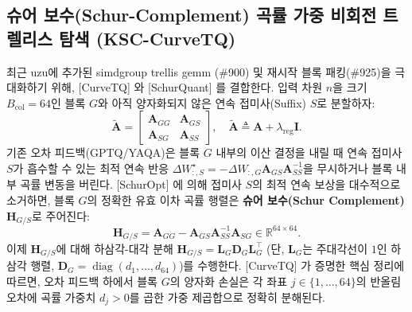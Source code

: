 \documentclass[10pt,a4paper]{article}
\begin{document}
\subsection{슈어 보수(Schur-Complement) 곡률 가중 비회전 트렐리스 탐색 (KSC-CurveTQ)}
최근 \textsf{uzu}에 추가된 \textsf{simdgroup trellis gemm} (\#900) 및 재시작 블록 패킹(\#925)을 극대화하기 위해, [CurveTQ] \cite{ding2026curvetq}와 [SchurQuant] \cite{lee2026schurquant}를 결합한다. 입력 차원 $n$을 크기 $B_{\text{col}}=64$인 블록 $G$와 아직 양자화되지 않은 연속 접미사(Suffix) $S$로 분할하자:
\begin{equation}
\widetilde{\mathbf{A}} = \begin{bmatrix} \mathbf{A}_{GG} & \mathbf{A}_{GS} \\ \mathbf{A}_{SG} & \mathbf{A}_{SS} \end{bmatrix}, \quad \widetilde{\mathbf{A}} \triangleq \mathbf{A} + \lambda_{\text{reg}} \mathbf{I}.
\end{equation}
기존 오차 피드백(GPTQ/YAQA)은 블록 $G$ 내부의 이산 결정을 내릴 때 연속 접미사 $S$가 흡수할 수 있는 최적 연속 반응 $\Delta W_{:,S}^\star = -\Delta W_{:,G} \mathbf{A}_{GS}\mathbf{A}_{SS}^{-1}$을 무시하거나 블록 내부 곡률 변동을 버린다. [SchurOpt] \cite{lee2026schurquant}에 의해 접미사 $S$의 최적 연속 보상을 대수적으로 소거하면, 블록 $G$의 정확한 유효 이차 곡률 행렬은 \textbf{슈어 보수(Schur Complement)} $\mathbf{H}_{G/S}$로 주어진다:
\begin{equation}
\mathbf{H}_{G/S} = \mathbf{A}_{GG} - \mathbf{A}_{GS} \mathbf{A}_{SS}^{-1} \mathbf{A}_{SG} \in \mathbb{R}^{64 \times 64}.
\label{eq:schur_complement}
\end{equation}
이제 $\mathbf{H}_{G/S}$에 대해 하삼각-대각 분해 $\mathbf{H}_{G/S} = \mathbf{L}_G \mathbf{D}_G \mathbf{L}_G^\top$ (단, $\mathbf{L}_G$는 주대각선이 $1$인 하삼각 행렬, $\mathbf{D}_G = \operatorname{diag}(d_1, \dots, d_{64})$)를 수행한다. [CurveTQ] \cite{ding2026curvetq}가 증명한 핵심 정리에 따르면, 오차 피드백 하에서 블록 $G$의 양자화 손실은 각 좌표 $j \in \{1,\dots,64\}$의 반올림 오차에 곡률 가중치 $d_j > 0$를 곱한 가중 제곱합으로 정확히 분해된다.
\end{document}
